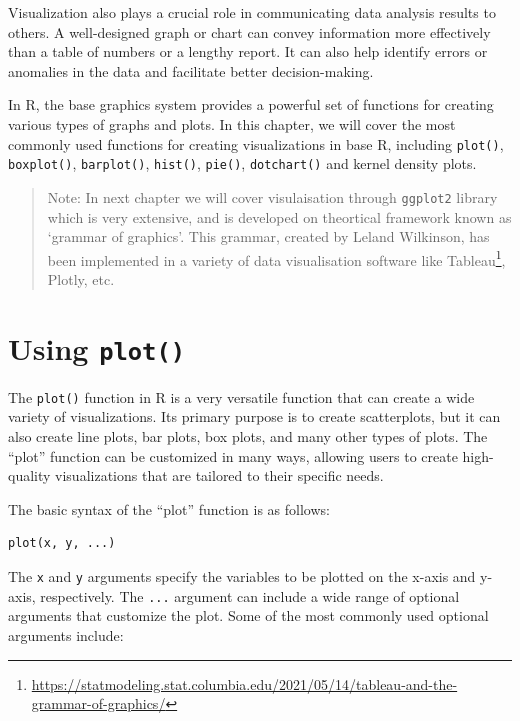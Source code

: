 \documentclass[
]{book}
\begin{document}
Visualization also plays a crucial role in communicating data analysis results to others. A well-designed graph or chart can convey information more effectively than a table of numbers or a lengthy report. It can also help identify errors or anomalies in the data and facilitate better decision-making.

In R, the base graphics system provides a powerful set of functions for creating various types of graphs and plots. In this chapter, we will cover the most commonly used functions for creating visualizations in base R, including \texttt{plot()}, \texttt{boxplot()}, \texttt{barplot()}, \texttt{hist()}, \texttt{pie()}, \texttt{dotchart()} and kernel density plots.

\begin{quote}
Note: In next chapter we will cover visulaisation through \texttt{ggplot2} library which is very extensive, and is developed on theortical framework known as `grammar of graphics'. This grammar, created by Leland Wilkinson, has been implemented in a variety of data visualisation software like Tableau\footnote{\url{https://statmodeling.stat.columbia.edu/2021/05/14/tableau-and-the-grammar-of-graphics/}}, Plotly, etc.
\end{quote}

\hypertarget{using-plot}{%
\section{\texorpdfstring{Using \texttt{plot()}}{Using plot()}}\label{using-plot}}

The \texttt{plot()} function in R is a very versatile function that can create a wide variety of visualizations. Its primary purpose is to create scatterplots, but it can also create line plots, bar plots, box plots, and many other types of plots. The ``plot'' function can be customized in many ways, allowing users to create high-quality visualizations that are tailored to their specific needs.

The basic syntax of the ``plot'' function is as follows:

\begin{verbatim}
plot(x, y, ...)
\end{verbatim}

The \texttt{x} and \texttt{y} arguments specify the variables to be plotted on the x-axis and y-axis, respectively. The \texttt{...} argument can include a wide range of optional arguments that customize the plot. Some of the most commonly used optional arguments include:
\end{document}
